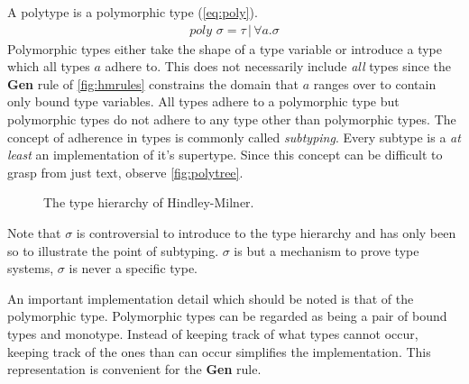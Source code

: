 \documentclass[11pt,oneside,a4paper]{report}
\begin{document}
A polytype is a polymorphic type (\autoref{eq:poly}).
\begin{align}
	poly \,\, \sigma = \tau \,|\, \forall a . \sigma
	\label{eq:poly}
\end{align}
Polymorphic types either take the shape of a type variable or introduce a type which all types $a$ adhere to. 
This does not necessarily include \textit{all} types since the \textbf{Gen} rule of \autoref{fig:hmrules} constrains the domain that $a$ ranges over to contain only bound type variables.
All types adhere to a polymorphic type but polymorphic types do not adhere to any type other than polymorphic types.
The concept of adherence in types is commonly called \textit{subtyping}.
Every subtype is a \textit{at least} an implementation of it's supertype.
Since this concept can be difficult to grasp from just text, observe \autoref{fig:polytree}.
\begin{figure}[ht]
    \centering
    \caption{The type hierarchy of Hindley-Milner.}
    \label{fig:polytree}
\end{figure}
Note that $\sigma$ is controversial to introduce to the type hierarchy and has only been so to illustrate the point of subtyping.
$\sigma$ is but a mechanism to prove type systems, $\sigma$ is never a specific type.
\begin{remark}
    \label{remark:polyimpl}
An important implementation detail which should be noted is that of the polymorphic type.
Polymorphic types can be regarded as being a pair of bound types and monotype.
Instead of keeping track of what types cannot occur, keeping track of the ones than can occur simplifies the implementation.
This representation is convenient for the \textbf{Gen} rule.
\end{remark}
\end{document}
